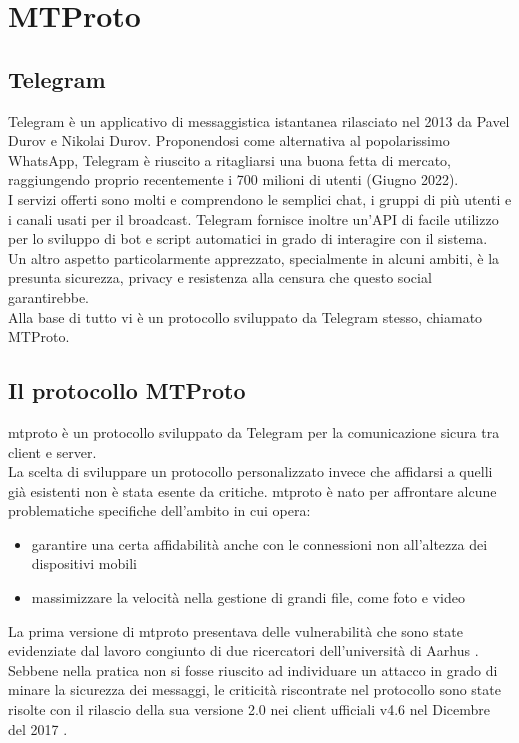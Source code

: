 \section{MTProto}

\subsection{Telegram}
Telegram è un applicativo di messaggistica istantanea rilasciato nel 2013 da Pavel Durov e Nikolai Durov.
Proponendosi come alternativa al popolarissimo WhatsApp, Telegram è riuscito a ritagliarsi una buona fetta di mercato,
raggiungendo proprio recentemente i 700 milioni di utenti (Giugno 2022). \\
I servizi offerti sono molti e comprendono le semplici chat, i gruppi di più utenti e i canali usati per il broadcast.
Telegram fornisce inoltre un'API di facile utilizzo per lo sviluppo di bot e script automatici in grado di interagire 
con il sistema. \\

Un altro aspetto particolarmente apprezzato, specialmente in alcuni ambiti, è la presunta sicurezza, privacy
e resistenza alla censura che questo social garantirebbe. \\
Alla base di tutto vi è un protocollo sviluppato da Telegram stesso, chiamato MTProto.

\subsection{Il protocollo MTProto}
\gls{mtproto} è un protocollo sviluppato da Telegram per la comunicazione sicura tra client e server. \\
La scelta di sviluppare un protocollo personalizzato invece che affidarsi a quelli già esistenti non è stata esente da critiche.
\gls{mtproto} è nato per affrontare alcune problematiche specifiche dell'ambito in cui opera:
\begin{itemize}
    \item garantire una certa affidabilità anche con le connessioni non all'altezza dei dispositivi mobili
    \item massimizzare la velocità nella gestione di grandi file, come foto e video
\end{itemize}

La prima versione di \gls{mtproto} presentava delle vulnerabilità che sono state evidenziate dal lavoro congiunto di due ricercatori dell'università di Aarhus \cite{inp:mtproto-v1-attacks}.
Sebbene nella pratica non si fosse riuscito ad individuare un attacco in grado di minare la sicurezza dei messaggi,
le criticità riscontrate nel protocollo sono state risolte con il rilascio della sua versione 2.0 nei client ufficiali v4.6 nel Dicembre del 2017 \cite{man:mtproto}. \\

